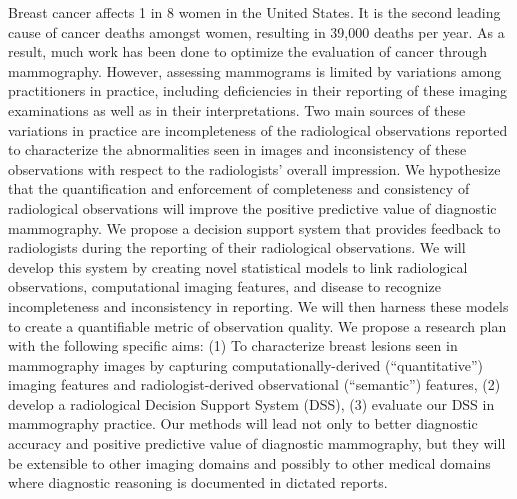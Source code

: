 Breast cancer affects 1 in 8 women in the United States. It is the second leading cause of cancer deaths amongst women, resulting in 39,000 deaths per year. As a result, much work has been done to optimize the evaluation of cancer through mammography. However, assessing mammograms is limited by variations among practitioners in practice, including deficiencies in their reporting of these imaging examinations as well as in their interpretations. Two main sources of these variations in practice are incompleteness of the radiological observations reported to characterize the abnormalities seen in images and inconsistency of these observations with respect to the radiologists’ overall impression. We hypothesize that the quantification and enforcement of completeness and consistency of radiological observations will improve the positive predictive value of diagnostic mammography. We propose a decision support system that provides feedback to radiologists during the reporting of their radiological observations. We will develop this system by creating novel statistical models to link radiological observations, computational imaging features, and disease to recognize incompleteness and inconsistency in reporting. We will then harness these models to create a quantifiable metric of observation quality. We propose a research plan with the following specific aims: (1) To characterize breast lesions seen in mammography images by capturing computationally-derived (“quantitative”) imaging features and radiologist-derived observational (“semantic”) features, (2) develop a radiological Decision Support System (DSS), (3) evaluate our DSS in mammography practice. Our methods will lead not only to better diagnostic accuracy and positive predictive value of diagnostic mammography, but they will be extensible to other imaging domains and possibly to other medical domains where diagnostic reasoning is documented in dictated reports.

